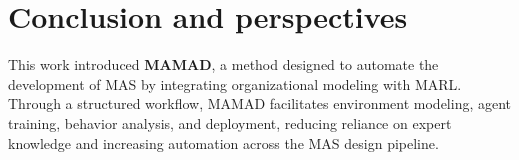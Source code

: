 \documentclass[pdflatex,sn-mathphys-num]{sn-jnl}%
\theoremstyle{thmstyleone}%
\theoremstyle{thmstyletwo}%
\theoremstyle{thmstylethree}%
\begin{document}






\section{Conclusion and perspectives}\label{sec:conclusion}

This work introduced \textbf{MAMAD}, a method designed to automate the development of MAS by integrating organizational modeling with MARL. Through a structured workflow, MAMAD facilitates environment modeling, agent training, behavior analysis, and deployment, reducing reliance on expert knowledge and increasing automation across the MAS design pipeline. 
\end{document}
